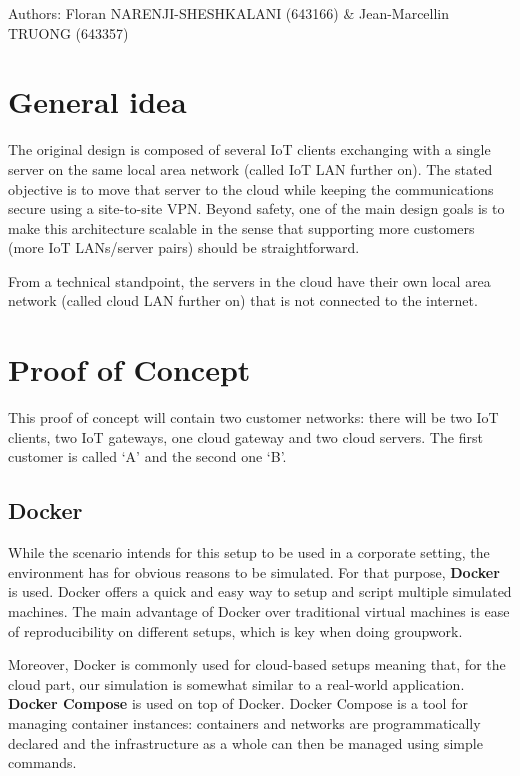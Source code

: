 \documentclass[paper=a4, fontsize=11pt]{scrartcl}
\author{Floran NARENJI-SHESHKALANI \& Jean-Marcellin TRUONG}
\begin{document}
Authors: Floran NARENJI-SHESHKALANI (643166) \& Jean-Marcellin TRUONG (643357)

\section{General idea}

The original design is composed of several IoT clients exchanging with a single
server on the same local area network (called IoT LAN further on).
The stated objective is to move that server to the cloud while keeping the
communications secure using a site-to-site VPN\@.
Beyond safety, one of the main design goals is to make this architecture
scalable in the sense that supporting more customers (more IoT LANs/server
pairs) should be straightforward.

From a technical standpoint, the servers in the cloud have their own local area
network (called cloud LAN further on) that is not connected to the internet.

\section{Proof of Concept}

This proof of concept will contain two customer networks: there will be two IoT
clients, two IoT gateways, one cloud gateway and two cloud servers.
The first customer is called `A' and the second one `B'.

\subsection{Docker}

While the scenario intends for this setup to be used in a corporate setting, the
environment has for obvious reasons to be simulated.
For that purpose, \textbf{Docker} is used. Docker offers a quick and easy way to setup
and script multiple simulated machines.
The main advantage of Docker over traditional virtual machines is ease of
reproducibility on different setups, which is key when doing groupwork.

Moreover, Docker is commonly used for cloud-based setups meaning that, for the
cloud part, our simulation is somewhat similar to a real-world application.
\\

\textbf{Docker Compose} is used on top of Docker. Docker Compose is a tool for managing
container instances: containers and networks are programmatically declared and
the infrastructure as a whole can then be managed using simple commands.
\end{document}

